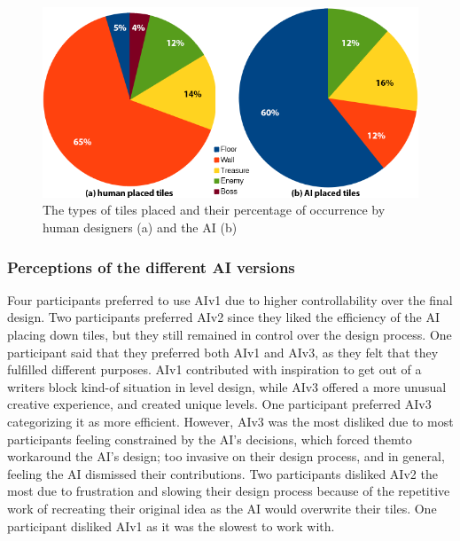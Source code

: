 
\begin{figure}[h]
 \includegraphics[width=\columnwidth]{images/combined_tile_types.png}
 \caption{The types of tiles placed and their percentage of occurrence by human designers (a) and the AI (b)}
 \label{fig:human-ai-tiletypes}
\end{figure}

\subsubsection{Perceptions of the different AI versions}

Four participants preferred to use AIv1 due to higher controllability over the final design. Two participants preferred AIv2 since they liked the efficiency of the AI placing down tiles, but they still remained in control over the design process. One participant said that they preferred both AIv1 and AIv3, as they felt that they fulfilled different purposes. AIv1 contributed with inspiration to get out of a writers block kind-of situation in level design, while AIv3 offered a more unusual creative experience, and created unique levels. One participant preferred AIv3 categorizing it as more efficient. However, AIv3 was the most disliked due to most participants feeling constrained by the AI's decisions, which forced themto workaround the AI's design; too invasive on their design process, and in general, feeling the AI dismissed their contributions. Two participants disliked AIv2 the most due to frustration and slowing their design process because of the repetitive work of recreating their original idea as the AI would overwrite their tiles. One participant disliked AIv1 as it was the slowest to work with.

